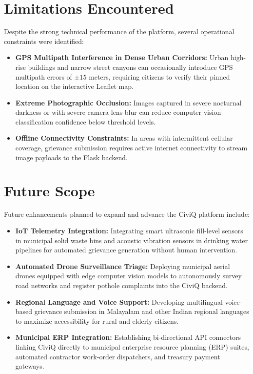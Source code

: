 \documentclass[12pt,a4paper]{report}
\begin{document}
\section{Limitations Encountered}
Despite the strong technical performance of the platform, several operational constraints were identified:
\begin{itemize}
    \item \textbf{GPS Multipath Interference in Dense Urban Corridors:} Urban high-rise buildings and narrow street canyons can occasionally introduce GPS multipath errors of $\pm 15$ meters, requiring citizens to verify their pinned location on the interactive Leaflet map.
    \item \textbf{Extreme Photographic Occlusion:} Images captured in severe nocturnal darkness or with severe camera lens blur can reduce computer vision classification confidence below threshold levels.
    \item \textbf{Offline Connectivity Constraints:} In areas with intermittent cellular coverage, grievance submission requires active internet connectivity to stream image payloads to the Flask backend.
\end{itemize}

\section{Future Scope}
Future enhancements planned to expand and advance the CiviQ platform include:
\begin{itemize}
    \item \textbf{IoT Telemetry Integration:} Integrating smart ultrasonic fill-level sensors in municipal solid waste bins and acoustic vibration sensors in drinking water pipelines for automated grievance generation without human intervention.
    \item \textbf{Automated Drone Surveillance Triage:} Deploying municipal aerial drones equipped with edge computer vision models to autonomously survey road networks and register pothole complaints into the CiviQ backend.
    \item \textbf{Regional Language and Voice Support:} Developing multilingual voice-based grievance submission in Malayalam and other Indian regional languages to maximize accessibility for rural and elderly citizens.
    \item \textbf{Municipal ERP Integration:} Establishing bi-directional API connectors linking CiviQ directly to municipal enterprise resource planning (ERP) suites, automated contractor work-order dispatchers, and treasury payment gateways.
\end{itemize}
\end{document}
